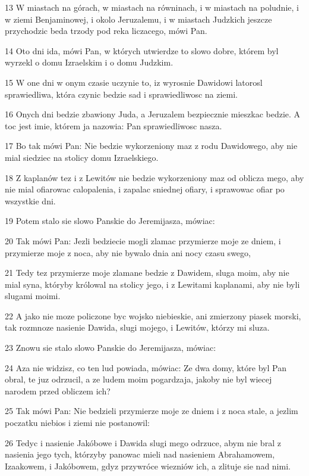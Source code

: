 \par 13 W miastach na górach, w miastach na równinach, i w miastach na poludnie, i w ziemi Benjaminowej, i okolo Jeruzalemu, i w miastach Judzkich jeszcze przychodzic beda trzody pod reka liczacego, mówi Pan.
\par 14 Oto dni ida, mówi Pan, w których utwierdze to slowo dobre, którem byl wyrzekl o domu Izraelskim i o domu Judzkim.
\par 15 W one dni w onym czasie uczynie to, iz wyrosnie Dawidowi latorosl sprawiedliwa, która czynic bedzie sad i sprawiedliwosc na ziemi.
\par 16 Onych dni bedzie zbawiony Juda, a Jeruzalem bezpiecznie mieszkac bedzie. A toc jest imie, którem ja nazowia: Pan sprawiedliwosc nasza.
\par 17 Bo tak mówi Pan: Nie bedzie wykorzeniony maz z rodu Dawidowego, aby nie mial siedziec na stolicy domu Izraelskiego.
\par 18 Z kaplanów tez i z Lewitów nie bedzie wykorzeniony maz od oblicza mego, aby nie mial ofiarowac calopalenia, i zapalac sniednej ofiary, i sprawowac ofiar po wszystkie dni.
\par 19 Potem stalo sie slowo Panskie do Jeremijasza, mówiac:
\par 20 Tak mówi Pan: Jezli bedziecie mogli zlamac przymierze moje ze dniem, i przymierze moje z noca, aby nie bywalo dnia ani nocy czasu swego,
\par 21 Tedy tez przymierze moje zlamane bedzie z Dawidem, sluga moim, aby nie mial syna, któryby królowal na stolicy jego, i z Lewitami kaplanami, aby nie byli slugami moimi.
\par 22 A jako nie moze policzone byc wojsko niebieskie, ani zmierzony piasek morski, tak rozmnoze nasienie Dawida, slugi mojego, i Lewitów, którzy mi sluza.
\par 23 Znowu sie stalo slowo Panskie do Jeremijasza, mówiac:
\par 24 Aza nie widzisz, co ten lud powiada, mówiac: Ze dwa domy, które byl Pan obral, te juz odrzucil, a ze ludem moim pogardzaja, jakoby nie byl wiecej narodem przed obliczem ich?
\par 25 Tak mówi Pan: Nie bedzieli przymierze moje ze dniem i z noca stale, a jezlim poczatku niebios i ziemi nie postanowil:
\par 26 Tedyc i nasienie Jakóbowe i Dawida slugi mego odrzuce, abym nie bral z nasienia jego tych, którzyby panowac mieli nad nasieniem Abrahamowem, Izaakowem, i Jakóbowem, gdyz przywróce wiezniów ich, a zlituje sie nad nimi.

